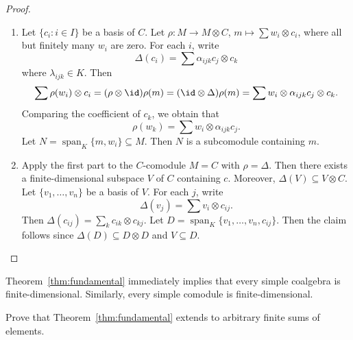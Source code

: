 \begin{proof}\
    \begin{enumerate}
            \item Let $\{c_i:i\in I\}$ be a basis of $C$. Let $\rho\colon M\to M\otimes C$, $m\mapsto\sum w_i\otimes c_i$, where all but finitely many $w_i$ are
            zero. For each $i$, write 
            \[
            \Delta(c_i)=\sum\alpha_{ijk}c_j\otimes c_k
            \]
            where $\lambda_{ijk}\in K$. Then
            \begin{align*}
                \sum\rho(w_i)\otimes c_i
                =(\rho\otimes\id)\rho(m)
                =(\id\otimes\Delta)\rho(m)
                =\sum w_i\otimes\alpha_{ijk}c_j\otimes c_k.
            \end{align*}
            Comparing the coefficient of $c_k$, we obtain that
            \[
            \rho(w_k)=\sum w_i\otimes\alpha_{ijk}c_j.
            \]
            Let $N=\operatorname{span}_K\{m,w_i\}\subseteq M$. 
            Then $N$ is a subcomodule containing $m$. 
        \item Apply the first part to the $C$-comodule 
        $M=C$ with $\rho=\Delta$. Then there exists 
        a finite-dimensional subspace $V$ of $C$ containing $c$. 
        Moreover, $\Delta(V)\subseteq V\otimes C$. Let $\{v_1,\dots,v_n\}$ be a basis of $V$. For each $j$, write
        \[
        \Delta(v_j)=\sum v_i\otimes c_{ij}. 
        \]
        Then $\Delta(c_{ij})=\sum_kc_{ik}\otimes c_{kj}$. Let 
        $D=\operatorname{span}_K\{v_1,\dots,v_n,c_{ij}\}$. Then the claim follows since 
        $\Delta(D)\subseteq D\otimes D$ and $V\subseteq D$.\qedhere 
    \end{enumerate}
\end{proof}

Theorem~\ref{thm:fundamental} immediately implies that every simple coalgebra is finite-dimensional. Similarly, every simple comodule is finite-dimensional.

\begin{exercise}
    Prove that Theorem~\ref{thm:fundamental} extends to arbitrary finite sums of elements.
\end{exercise}



